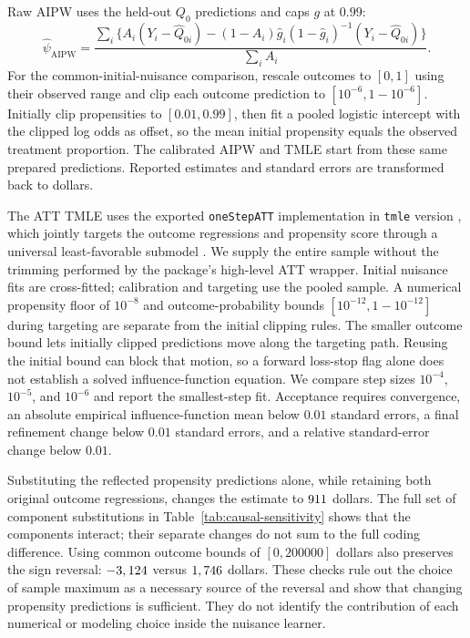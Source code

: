 \documentclass[11pt]{article}
\theoremstyle{definition}
\theoremstyle{remark}
\begin{document}
Raw AIPW uses the held-out $Q_0$ predictions and caps $g$ at $0.99$:
\[
 \hat\psi_{\mathrm{AIPW}}=
 \frac{\sum_i\{A_i(Y_i-\hat Q_{0i})-
 (1-A_i)\hat g_i(1-\hat g_i)^{-1}(Y_i-\hat Q_{0i})\}}
 {\sum_i A_i}.
\]
For the common-initial-nuisance comparison, rescale outcomes to $[0,1]$
using their observed range \citep{gruber2010} and clip each outcome prediction to
$[10^{-6},1-10^{-6}]$. Initially clip propensities to $[0.01,0.99]$, then
fit a pooled logistic intercept with the clipped log odds as offset, so
the mean initial propensity equals the observed treatment proportion.
The calibrated AIPW and TMLE start from these same prepared predictions.
Reported estimates and standard errors are transformed back to dollars.

The ATT TMLE uses the exported \texttt{oneStepATT} implementation in
\texttt{tmle} version \TmleVersion{}, which jointly targets the outcome regressions
and propensity score through a universal least-favorable submodel
\citep{vanderlaan2016}. We supply the entire sample without the trimming
performed by the package's high-level ATT wrapper. Initial nuisance fits
are cross-fitted; calibration and targeting use the pooled sample.
A numerical propensity floor of $10^{-8}$ and outcome-probability bounds
$[10^{-12},1-10^{-12}]$ during targeting are separate from the initial
clipping rules. The smaller outcome bound lets initially clipped predictions
move along the targeting path. Reusing the initial bound can block that
motion, so a forward loss-stop flag alone does not establish a solved
influence-function equation. We compare step sizes $10^{-4}$,
$10^{-5}$, and $10^{-6}$ and report the smallest-step fit. Acceptance
requires convergence, an absolute empirical influence-function mean below
$0.01$ standard errors, a final refinement change below $0.01$ standard
errors, and a relative standard-error change below $0.01$.



Substituting the reflected propensity predictions alone, while retaining
both original outcome regressions, changes the estimate to
$911$ dollars. The full set of component substitutions
in Table~\ref{tab:causal-sensitivity} shows that the components interact;
their separate changes do not sum to the full coding difference. Using
common outcome bounds of $[0,200000]$ dollars also preserves the sign
reversal: $-3,124$ versus $1,746$ dollars.
These checks rule out the choice of sample maximum as a necessary source
of the reversal and show that changing propensity predictions is sufficient.
They do not identify the contribution of each numerical or modeling choice
inside the nuisance learner.
\end{document}

